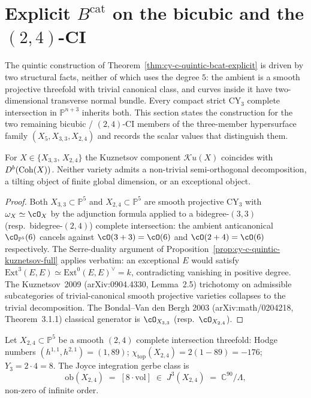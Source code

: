 \section{Explicit \texorpdfstring{$B^{\mathrm{cat}}$}{B-cat} on the bicubic and the \texorpdfstring{$(2,4)$}{(2,4)}-CI}
\label{sec:cy-c-beyond-bicubic-24CI-bcat-explicit}

The quintic construction of
Theorem~\ref{thm:cy-c-quintic-bcat-explicit} is driven by two
structural facts, neither of which uses the degree $5$: the ambient
is a smooth projective threefold with trivial canonical class, and
curves inside it have two-dimensional transverse normal bundle. Every
compact strict CY$_3$ complete intersection in $\mathbb P^{n+3}$
inherits both. This section states the construction for the two
remaining bicubic / $(2,4)$-CI members of the three-member hypersurface
family $(X_5, X_{3,3}, X_{2,4})$ and records the scalar values that
distinguish them.

\begin{proposition}
\label{prop:cy-c-bicubic-24CI-kuznetsov-full}
For $X \in \{X_{3,3},\, X_{2,4}\}$ the Kuznetsov component
$\mathcal{K}u(X)$ coincides with $D^b(\mathrm{Coh}(X))$. Neither variety admits
a non-trivial semi-orthogonal decomposition, a tilting object of
finite global dimension, or an exceptional object.
\end{proposition}

\begin{proof}
Both $X_{3,3} \subset \mathbb P^5$ and $X_{2,4} \subset \mathbb P^5$ are
smooth projective CY$_3$ with $\omega_X \simeq \cO_X$ by the adjunction
formula applied to a bidegree-$(3,3)$ (resp.\ bidegree-$(2,4)$) complete
intersection: the ambient anticanonical $\cO_{\mathbb P^5}(6)$ cancels
against $\cO(3+3) = \cO(6)$ and $\cO(2+4) = \cO(6)$ respectively. The
Serre-duality argument of
Proposition~\ref{prop:cy-c-quintic-kuznetsov-full} applies verbatim:
an exceptional $E$ would satisfy
$\mathrm{Ext}^3(E,E) \simeq \mathrm{Ext}^0(E,E)^\vee = k$, contradicting
vanishing in positive degree. The Kuznetsov~2009
(arXiv:0904.4330, Lemma~2.5) trichotomy on admissible subcategories of
trivial-canonical smooth projective varieties collapses to the trivial
decomposition. The Bondal--Van den Bergh 2003
(arXiv:math/0204218, Theorem~3.1.1) classical generator is
$\cO_{X_{3,3}}$ (resp.\ $\cO_{X_{2,4}}$).
\end{proof}

\begin{proposition}
\label{prop:cy-c-beyond-joyce-24CI}
Let $X_{2,4} \subset \mathbb P^5$ be a smooth $(2,4)$ complete
intersection threefold: Hodge numbers
$(h^{1,1}, h^{2,1}) = (1, 89)$; $\chi_{\mathrm{top}}(X_{2,4}) = 2(1-89) = -176$;
$Y_3 = 2 \cdot 4 = 8$. The Joyce integration gerbe class is
\[
 \mathrm{ob}(X_{2,4}) \;=\; [8 \cdot \mathrm{vol}] \;\in\; J^3(X_{2,4})
 \;=\; \mathbb C^{90}/\Lambda,
\]
non-zero of infinite order.
\end{proposition}

